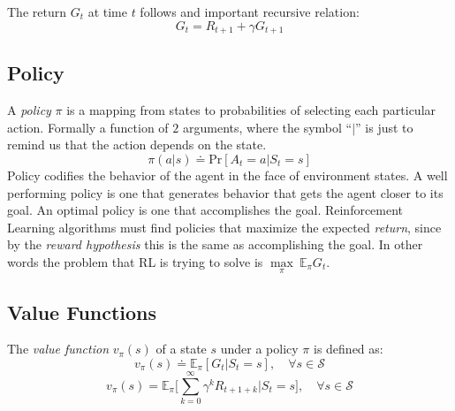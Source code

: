 \documentclass[
  openany]{book}
\begin{document}
The return \(G_t\) at time \(t\) follows and important recursive relation:
\[G_t = R_{t+1} + \gamma G_{t+1}\]

\hypertarget{policy}{%
\subsection{Policy}\label{policy}}

A \emph{policy} \(\pi\) is a mapping from states to probabilities of selecting each particular action. Formally a function of \(2\) arguments, where the symbol ``\(|\)'' is just to remind us that the action depends on the state.
\[ \pi(a|s) \doteq \text{Pr}[A_t=a | S_t=s]\]
Policy codifies the behavior of the agent in the face of environment states. A well performing policy is one that generates behavior that gets the agent closer to its goal. An optimal policy is one that accomplishes the goal. Reinforcement Learning algorithms must find policies that maximize the expected \emph{return}, since by the \emph{reward hypothesis} this is the same as accomplishing the goal. In other words the problem that RL is trying to solve is \(\underset {\pi} \max\ \mathds{E}_\pi G_t\).

\hypertarget{value-functions}{%
\subsection{Value Functions}\label{value-functions}}

The \emph{value function} \(v_\pi(s)\) of a state \(s\) under a policy \(\pi\) is defined as:
\[v_\pi(s) \doteq \mathds{E}_\pi [ G_t | S_t = s ], \quad \forall s \in \mathcal{S}\]
\[v_\pi(s) = \mathds{E}_\pi \bigg[ \sum_{k=0}^{\infty} \gamma^k R_{t+1+k} \bigg| S_t = s \bigg], \quad \forall s \in \mathcal{S}\]
\end{document}
